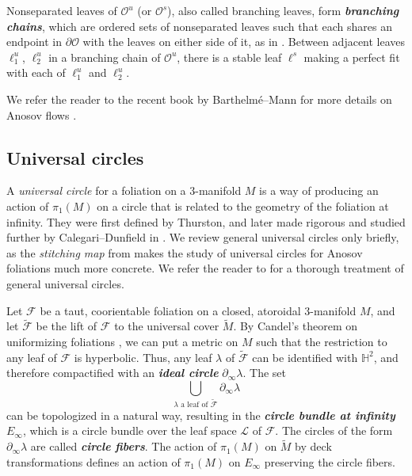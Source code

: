 \documentclass[11pt]{amsart}
\newcommand{\HH}[0]{\mathbb{H}}
\renewcommand{\l}{\lambda}
\newcommand{\wt}{\widetilde}
\newcommand{\mc}{\mathcal}
\newcommand{\orb}{\mathcal{O}}
\newcommand{\defn}[1]{\textbf{\emph{#1}}}
\numberwithin{equation}{section}
\theoremstyle{definition}
\begin{document}
Nonseparated leaves of $\orb^{u}$ (or $\orb^s$), also called branching leaves, form \defn{branching chains}, which are ordered sets of nonseparated leaves such that each shares an endpoint in $\partial\orb$ with the leaves on either side of it, as in . Between adjacent leaves $\ell^u_1$, $\ell^u_2$ in a branching chain of $\orb^u$, there is a stable leaf $\ell^s$ making a perfect fit with each of $\ell^u_1$ and $\ell^u_2$.

We refer the reader to the recent book by Barthelm\'{e}--Mann for more details on Anosov flows \cite{barthelme2025pseudo}.


\subsection{Universal circles}\label{sec:uc_background}
A \emph{universal circle} for a foliation on a 3-manifold $M$ is a way of producing an action of $\pi_1(M)$ on a circle that is related to the geometry of the foliation at infinity. They were first defined by Thurston, and later made rigorous and studied further by Calegari--Dunfield in \cite{CalDun_UC}. We review general universal circles only briefly, as the \emph{stitching map} from \cite{buckminster2025universal} makes the study of universal circles for Anosov foliations much more concrete. We refer the reader to \cite{CalDun_UC} for a thorough treatment of general universal circles.

Let $\mc F$ be a taut, coorientable foliation on a closed, atoroidal 3-manifold $M$, and let $\wt {\mc F}$ be the lift of $\mc F$ to the universal cover $\wt M$. By Candel's theorem on uniformizing foliations \cite{Candel_uniformization}, we can put a metric on $M$ such that the restriction to any leaf of $\mc F$ is hyperbolic. Thus, any leaf $\l$ of $\wt{\mc F}$ can be identified with $\HH^2$, and therefore compactified with an \defn{ideal circle} $\partial_\infty\l$. The set 
\[
\bigcup_{\l\text{ a leaf of }\wt{\mc F}}\partial_\infty\l
\]
can be topologized in a natural way, resulting in the \defn{circle bundle at infinity} $E_\infty$, which is a circle bundle over the leaf space $\mc L$ of $\mc F$. The circles of the form $\partial_\infty\l$ are called \defn{circle fibers}. The action of $\pi_1(M)$ on $\wt M$ by deck transformations defines an action of $\pi_1(M)$ on $E_\infty$ preserving the circle fibers.
\end{document}
